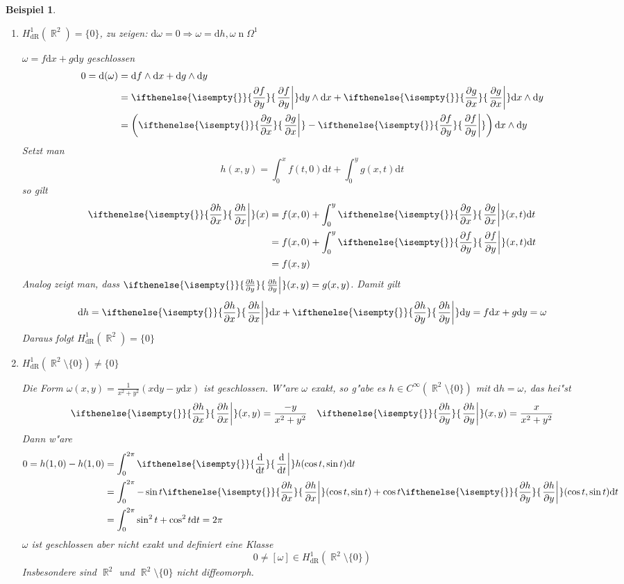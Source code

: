 \documentclass[paper=A4, twoside, chapterprefix=true, bibliography=totoc, headsepline]{scrbook}
\DeclareMathOperator{\R}{\mathbb{R}}
\DeclareMathOperator{\dR}{dR} %
\DeclareMathOperator{\n}{n} %
\newcommand{\dop}{\mathrm{d}}
\newcommand{\difffrac}[3][]{\ifthenelse{\isempty{#1}}{\frac{\dop #2}{\dop #3}}{\left. \frac{\dop #2}{\dop #3} \right|_{#1}}}
\newcommand{\pdifffrac}[3][]{\ifthenelse{\isempty{#1}}{\frac{\partial #2}{\partial #3}}{\left. \frac{\partial #2}{\partial #3} \right|_{#1}}}
\theoremstyle{plain}
\theoremstyle{nonumberplain}
\newtheorem{bsp}{Beispiel}
\theoremstyle{empty}
\theoremstyle{break}
\begin{document}
\begin{bsp}
  \begin{enumerate}[label=(\arabic*),leftmargin=*]
  \item $H_{\dR}^1(\R^2) = \{0\}$, \emph{zu zeigen:} $\dop \omega = 0 \Rightarrow \omega = \dop h, \omega \n \Omega^1$
    
    $\omega = f \dop x + g \dop y$ geschlossen
    \begin{align*}
      0 = \dop (\omega) &= \dop f \wedge \dop x + \dop g \wedge \dop y\\
      &= \pdifffrac{f}{y} \dop y \wedge \dop x + \pdifffrac{g}{x} \dop x \wedge \dop y\\
      &= \left( \pdifffrac{g}{x} - \pdifffrac{f}{y} \right) \dop x \wedge \dop y
    \end{align*}
    Setzt man
    \[ h(x,y) = \int_0^{x} f(t,0) \dop t + \int_0^{y} g(x,t) \dop t \]
    so gilt
    \begin{align*}
      \pdifffrac{h}{x}(x) &= f(x,0) + \int_0^{y} \pdifffrac{g}{x}(x,t) \dop t\\
      &= f(x,0) + \int_0^{y} \pdifffrac{f}{y} (x,t) \dop t\\
      &= f(x,y)
    \end{align*}
    Analog zeigt man, dass $\pdifffrac{h}{y}(x,y) = g(x,y)$. Damit gilt
    \[ \dop h = \pdifffrac{h}{x} \dop x + \pdifffrac{h}{y} \dop y = f \dop x + g \dop y = \omega \]
    Daraus folgt $H_{\dR}^1(\R^2) = \{0\}$
  \item $H_{\dR}^1(\R^2 \setminus \{0\}) \ne \{0\}$
    
    Die Form $\omega(x,y) = \frac{1}{x^2+y^2} (x \dop y - y \dop x)$ ist geschlossen. W"are $\omega$ exakt, so g"abe es $h \in C^{\infty}(\R^2 \setminus \{0\})$ mit $\dop h = \omega$, das hei"st
    \begin{align*}
	    	\pdifffrac{h}{x}(x,y) = \frac{-y}{x^2+y^2} && \pdifffrac{h}{y}(x,y) = \frac{x}{x^2+y^2}
	\end{align*}
    Dann w"are
    \begin{align*}
      0 = h(1,0) - h(1,0) &= \int_{0}^{2\pi} \difffrac{}{t} h(\cos t, \sin t) \dop t\\
      &= \int_{0}^{2\pi} - \sin t \pdifffrac{h}{x} (\cos t, \sin t) + \cos t \pdifffrac{h}{y} (\cos t, \sin t) \dop t\\
      &= \int_{0}^{2\pi} \sin^2 t + \cos^2 t \dop t = 2 \pi
    \end{align*}
    $\omega$ ist geschlossen aber \emph{nicht} exakt und definiert eine Klasse
    \[ 0 \ne [\omega] \in H_{\dR}^1(\R^2 \setminus \{0\}) \]
    Insbesondere sind $\R^2$ und $\R^2 \setminus \{0\}$ \emph{nicht} diffeomorph.
  \end{enumerate}
\end{bsp}
\end{document}
